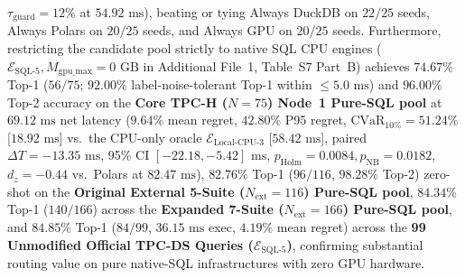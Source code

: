 \documentclass[10pt,a4paper]{article}
\begin{document}
$\tau_{\text{guard}}=12\%$ at $54.92\text{ ms}$), beating or tying Always DuckDB on $22/25$ seeds, Always Polars on $20/25$ seeds, and Always GPU on $20/25$ seeds. Furthermore, restricting the candidate pool strictly to native SQL CPU engines ($\mathcal{E}_{\text{SQL-5}}, M_{\text{gpu\_max}}=0\text{ GB}$ in Additional File~1, Table~S7 Part~B) achieves $\mathbf{74.67\%}$ Top-1 ($56/75$; $\mathbf{92.00\%}$ label-noise-tolerant Top-1 within $\le 5.0\text{ ms}$) and $\mathbf{96.00\%}$ Top-2 accuracy on the \textbf{Core TPC-H ($N=75$) Node~1 Pure-SQL pool} at $69.12\text{ ms}$ net latency ($9.64\%$ mean regret, $42.80\%$ P95 regret, $\text{CVaR}_{10\%}=51.24\%$ [$18.92\text{ ms}$] vs.\ the CPU-only oracle $\mathcal{E}_{\text{Local-CPU-3}}$ [$58.42\text{ ms}$], paired $\Delta T = -13.35\text{ ms}$, 95\% CI $[-22.18, -5.42]\text{ ms}$, $p_{\text{Holm}}=0.0084, p_{\text{NB}}=0.0182$, $d_z = -0.44$ vs.\ Polars at $82.47\text{ ms}$), $\mathbf{82.76\%}$ Top-1 ($96/116$, $\mathbf{98.28\%}$ Top-2) zero-shot on the \textbf{Original External 5-Suite ($N_{\text{ext}}=116$) Pure-SQL pool}, $\mathbf{84.34\%}$ Top-1 ($140/166$) across the \textbf{Expanded 7-Suite ($N_{\text{ext}}=166$) Pure-SQL pool}, and $\mathbf{84.85\%}$ Top-1 ($84/99$, $36.15\text{ ms}$ exec, $4.19\%$ mean regret) across the \textbf{99 Unmodified Official TPC-DS Queries ($\mathcal{E}_{\text{SQL-5}}$)}, confirming substantial routing value on pure native-SQL infrastructures with zero GPU hardware.
\end{document}
